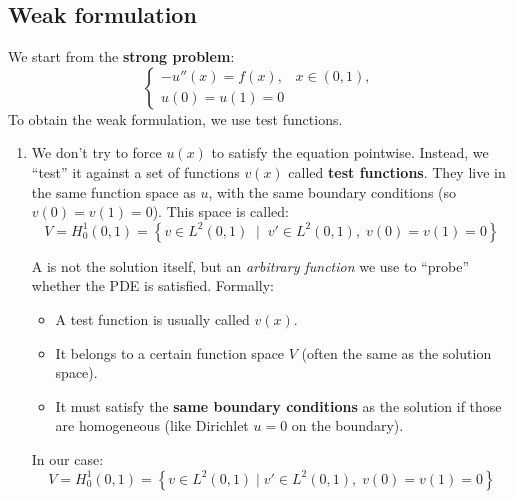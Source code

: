 \subsection{Weak formulation}

We start from the \textbf{strong problem}:
\begin{equation*}
    \begin{cases}
        - u''(x) = f(x), & x \in (0,1), \\[.5em]
        u(0)=u(1)=0 &
    \end{cases}
\end{equation*}
To obtain the weak formulation, we use test functions.
\begin{enumerate}
    \item {} We don't try to force $u(x)$ to satisfy the equation pointwise. Instead, we ``test'' it against a set of functions $v(x)$ called \textbf{test functions}. They live in the same function space as $u$, with the same boundary conditions (so $v(0)=v(1)=0$). This space is called:
    \begin{equation}
        V = H^1_0(0,1) = \left\{ v \in L^2(0,1) \;\;|\;\; v' \in L^2(0,1),\; v(0)=v(1)=0 \right\}
    \end{equation}

    \begin{deepeningbox}
        A  is not the solution itself, but an \emph{arbitrary function} we use to ``probe'' whether the PDE is satisfied. Formally:
        \begin{itemize}
            \item A test function is usually called $v(x)$.
            \item It belongs to a certain function space $V$ (often the same as the solution space).
            \item It must satisfy the \textbf{same boundary conditions} as the solution if those are homogeneous (like Dirichlet $u=0$ on the boundary).
        \end{itemize}
        In our case:
        \begin{equation*}
            V = H^1_0(0,1) = \left\{ v \in L^2(0,1) \mid v' \in L^2(0,1),\; v(0)=v(1)=0 \right\}
        \end{equation*}


\end{deepeningbox}
\end{enumerate}
